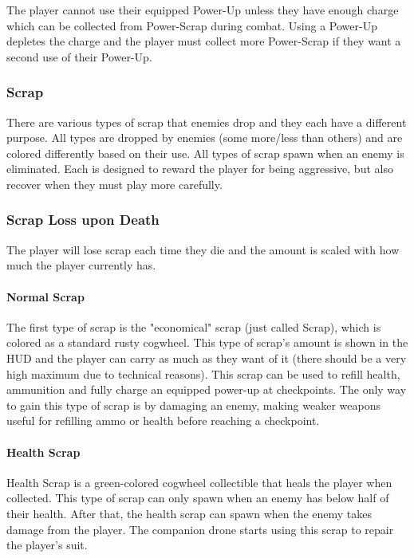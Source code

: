 \documentclass[12pt]{article}
\begin{document}
The player cannot use their equipped Power-Up unless they have enough charge which can be collected from Power-Scrap during combat. Using a Power-Up depletes the charge and the player must collect more Power-Scrap if they want a second use of their Power-Up. 

\subsubsection{Scrap}

There are various types of scrap that enemies drop and they each have a different purpose. All types are dropped by enemies (some more/less than others) and are colored differently based on their use. All types of scrap spawn when an enemy is eliminated. Each is designed to reward the player for being aggressive, but also recover when they must play more carefully. 

\subsubsection{Scrap Loss upon Death}

The player will lose scrap each time they die and the amount is scaled with how much the player currently has. 

\paragraph{Normal Scrap}

The first type of scrap is the "economical" scrap (just called Scrap), which is colored as a standard rusty cogwheel. This type of scrap's amount is shown in the HUD and the player can carry as much as they want of it (there should be a very high maximum due to technical reasons). This scrap can be used to refill health, ammunition and fully charge an equipped power-up at checkpoints. %
The only way to gain this type of scrap is by damaging an enemy, making weaker weapons useful for refilling ammo or health before reaching a checkpoint. 

\paragraph{Health Scrap}

Health Scrap is a green-colored cogwheel collectible that heals the player when collected. This type of scrap can only spawn when an enemy has below half of their health. After that, the health scrap can spawn when the enemy takes damage from the player. The companion drone starts using this scrap to repair the player's suit. 
\end{document}

